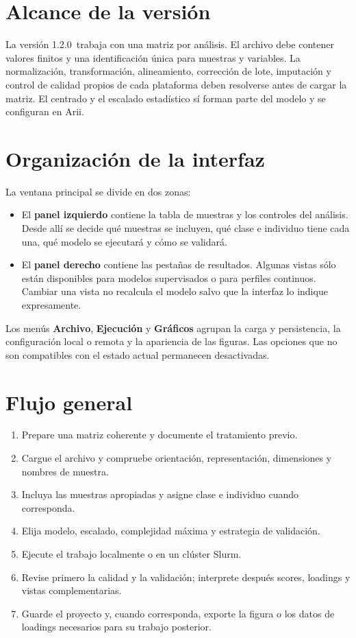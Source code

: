 \documentclass[11pt,a4paper,openany]{report}
\newcommand{\AriiVersion}{1.2.0}
\newcommand{\menu}[1]{\textbf{#1}}
\begin{document}
\section{Alcance de la versión}

La versión \AriiVersion\ trabaja con una matriz por análisis. El archivo debe
contener valores finitos y una identificación única para muestras y variables.
La normalización, transformación, alineamiento, corrección de lote, imputación y
control de calidad propios de cada plataforma deben resolverse antes de cargar
la matriz. El centrado y el escalado estadístico sí forman parte del modelo y se
configuran en Arii.

\section{Organización de la interfaz}

La ventana principal se divide en dos zonas:

\begin{itemize}
  \item El \textbf{panel izquierdo} contiene la tabla de muestras y los
  controles del análisis. Desde allí se decide qué muestras se incluyen, qué
  clase e individuo tiene cada una, qué modelo se ejecutará y cómo se validará.
  \item El \textbf{panel derecho} contiene las pestañas de resultados. Algunas
  vistas sólo están disponibles para modelos supervisados o para perfiles
  continuos. Cambiar una vista no recalcula el modelo salvo que la interfaz lo
  indique expresamente.
\end{itemize}

Los menús \menu{Archivo}, \menu{Ejecución} y \menu{Gráficos} agrupan la carga y
persistencia, la configuración local o remota y la apariencia de las figuras.
Las opciones que no son compatibles con el estado actual permanecen
desactivadas.

\newpage

\section{Flujo general}

\begin{enumerate}[leftmargin=*]
  \item Prepare una matriz coherente y documente el tratamiento previo.
  \item Cargue el archivo y compruebe orientación, representación, dimensiones
  y nombres de muestra.
  \item Incluya las muestras apropiadas y asigne clase e individuo cuando
  corresponda.
  \item Elija modelo, escalado, complejidad máxima y estrategia de validación.
  \item Ejecute el trabajo localmente o en un clúster Slurm.
  \item Revise primero la calidad y la validación; interprete después scores,
  loadings y vistas complementarias.
  \item Guarde el proyecto y, cuando corresponda, exporte la figura o los datos
  de loadings necesarios para su trabajo posterior.
\end{enumerate}
\end{document}
